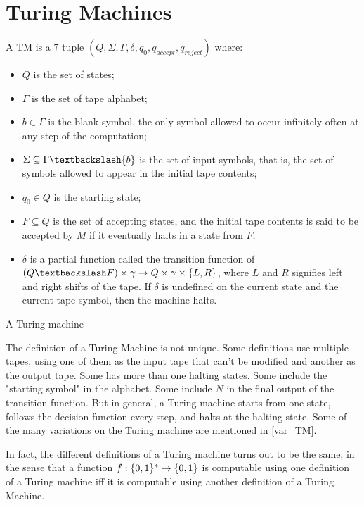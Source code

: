 \documentclass{report}
\begin{document}
	\section{Turing Machines}
		\begin{defn} \label{def_TM}
			A TM is a 7 tuple $(Q,\Sigma,\Gamma,\delta,q_0,q_{accept},q_{reject})$ where:
			\begin{itemize}
				\item $Q$ is the set of states;
				\item $\Gamma$ is the set of tape alphabet;
				\item $b \in \Gamma$ is the blank symbol, the only symbol allowed to occur infinitely often at any step of the computation;
				\item $\Sigma \subseteq \Gamma \textbackslash \{b\}$ is the set of input symbols, that is, the set of symbols allowed to appear in the initial tape contents;
				\item $q_0 \in Q$ is the starting state;
				\item $F \subseteq Q$ is the set of accepting states, and the initial tape contents is said to be accepted by $M$ if it eventually halts in a state from $F$;
				\item $\delta$ is a partial function called the transition function of $(Q \textbackslash F) \times \gamma \rightarrow Q \times \gamma \times \{L,R\}$, where $L$ and $R$ signifies left and right shifts of the tape. If $\delta$ is undefined on the current state and the current tape symbol, then the machine halts.
			\end{itemize}
			A Turing machine 
		\end{defn}
		The definition of a Turing Machine is not unique. Some definitions use multiple tapes, using one of them as the input tape that can't be modified and another as the output tape. Some has more than one halting states. Some include the "starting symbol" in the alphabet. Some include $N$ in the final output of the transition function. But in general, a Turing machine starts from one state, follows the decision function every step, and halts at the halting state. Some of the many variations on the Turing machine are mentioned in \ref{var_TM}.
		
		In fact, the different definitions of a Turing machine turns out to be the same, in the sense that a function $f:\{0,1\}^\ast \rightarrow \{0,1\}$ is computable using one definition of a Turing machine iff it is computable using another definition of a Turing Machine.
		
\end{document}
